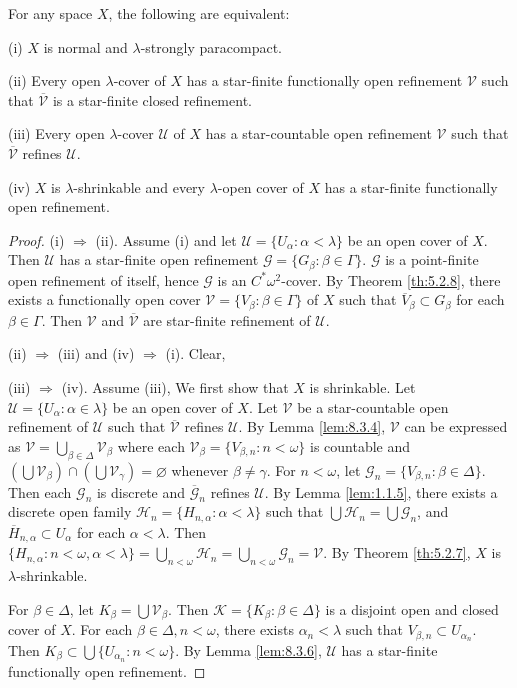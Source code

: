 \documentclass[jiang8iv.tex]{subfiles}
\begin{document}
{\theorem{\label{th:8.3.7}} 
For any space $X$, the following are equivalent:

\textup{(i)}  $X$ is normal and $\lambda$-strongly paracompact.

\textup{(ii)}  Every open $\lambda$-cover of $X$ has a star-finite functionally 
open refinement $\mathscr{V}$ such that $\mathscr{\overline{V}}$ is a star-finite closed refinement.

\textup{(iii)}  Every open $\lambda$-cover $\mathscr{U}$ of $X$ has a star-countable open refinement $\mathscr{V}$ such that $\mathscr{\overline{V}}$ refines $\mathscr{U}$.

\textup{(iv)} $X$ is $\lambda$-shrinkable and every $\lambda$-open cover of $X$ 
has a star-finite functionally open refinement.
}


\begin{proof} 
(i) $\Rightarrow$ (ii). Assume (i) and let $\mathscr{U}= \{U_\alpha: \alpha<\lambda\}$ 
be an open cover of $X$. Then $\mathscr{U}$ has a star-finite open refinement
$\mathscr{G} = \{G_\beta : \beta \in \Gamma\}$. $\mathscr{G}$ is a 
point-finite open refinement of itself,
hence $\mathscr{G}$ is an $C^*\omega^2$-cover. By Theorem \ref{th:5.2.8},
 there exists a functionally open cover $\mathscr{V} = \{V_\beta: \beta\in \Gamma\}$
of $X$ such that
$\overline{V}_\beta\subset G_\beta$ for each $\beta\in\Gamma$.
Then $\mathscr{V}$ and $\mathscr{\overline{V}}$ are star-finite
refinement of $\mathscr{U}$.

(ii) $\Rightarrow$ (iii) and (iv) $\Rightarrow$ (i). Clear,

(iii) $\Rightarrow$ (iv). 
Assume (iii),  
We first show that $X$ is shrinkable.
Let $\mathscr{U} = \{U_\alpha : \alpha \in \lambda\}$ be an open cover of $X$. Let $\mathscr{V}$
be a star-countable open refinement of $\mathscr{U}$ such that 
$\mathscr{\overline{V}}$
refines $\mathscr{U}$. 
By Lemma \ref{lem:8.3.4}, 
$\mathscr{V}$ can be expressed as
$\mathscr{V} = \bigcup_{\beta\in\Delta} \mathscr{V}_\beta$ where each $\mathscr{V}_\beta= \{V_{\beta,n}: n < \omega\}$ is countable
and $(\bigcup \mathscr{V}_\beta) \cap (\bigcup \mathscr{V}_\gamma) = \varnothing$ whenever $\beta \neq \gamma$. For $n< \omega$, let
$\mathscr{G}_n = \{V_{\beta, n}: \beta\in \Delta\}$. Then each 
$\mathscr{G}_n $ is discrete and $\mathscr{\overline{G}}_n $ refines $\mathscr{U}$.
By Lemma \ref{lem:1.1.5}, there exists a discrete open 
family $\mathscr{H}_n=\{H_{n,\alpha}:\alpha < \lambda\}$ such that 
$\bigcup\mathscr{H}_n = \bigcup\mathscr{G}_n $, and 
$\overline{H}_{n,\alpha}\subset U_\alpha$ for each $\alpha < \lambda$.
Then $\{H_{n,\alpha}:n < \omega, \alpha < \lambda\} = 
\bigcup_{n<\omega}\mathscr{H}_n = \bigcup_{n<\omega}\mathscr{G}_n
=\mathscr{V}$. By Theorem \ref{th:5.2.7}, $X$ is $\lambda$-shrinkable.

For $\beta\in\Delta$, let 
$K_\beta = \bigcup\mathscr{V}_\beta$. Then 
$\mathscr{K}=\{K_\beta:\beta\in\Delta\}$ is a disjoint open and closed cover of $X$.
For each $\beta\in \Delta, n <\omega$, there exists $\alpha_n <\lambda$ such that 
$V_{\beta, n}\subset U_{\alpha_n}$. Then  
$K_\beta\subset \bigcup\{U_{\alpha_n}: n < \omega\}$. By Lemma \ref{lem:8.3.6}, 
$\mathscr{U}$ has a star-finite functionally open refinement.
\end{proof}
\end{document}
